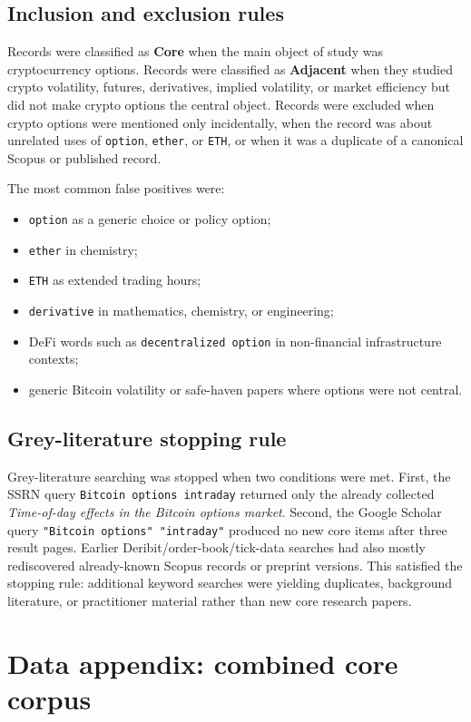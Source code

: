 \documentclass[11pt,a4paper]{article}
\begin{document}
\subsection{Inclusion and exclusion rules}

Records were classified as \textbf{Core} when the main object of study was cryptocurrency options. Records were classified as \textbf{Adjacent} when they studied crypto volatility, futures, derivatives, implied volatility, or market efficiency but did not make crypto options the central object. Records were excluded when crypto options were mentioned only incidentally, when the record was about unrelated uses of \texttt{option}, \texttt{ether}, or \texttt{ETH}, or when it was a duplicate of a canonical Scopus or published record.

The most common false positives were:
\begin{itemize}
    \item \texttt{option} as a generic choice or policy option;
    \item \texttt{ether} in chemistry;
    \item \texttt{ETH} as extended trading hours;
    \item \texttt{derivative} in mathematics, chemistry, or engineering;
    \item DeFi words such as \texttt{decentralized option} in non-financial infrastructure contexts;
    \item generic Bitcoin volatility or safe-haven papers where options were not central.
\end{itemize}

\subsection{Grey-literature stopping rule}

Grey-literature searching was stopped when two conditions were met. First, the SSRN query \texttt{Bitcoin options intraday} returned only the already collected \emph{Time-of-day effects in the Bitcoin options market}. Second, the Google Scholar query \texttt{"Bitcoin options" "intraday"} produced no new core items after three result pages. Earlier Deribit/order-book/tick-data searches had also mostly rediscovered already-known Scopus records or preprint versions. This satisfied the stopping rule: additional keyword searches were yielding duplicates, background literature, or practitioner material rather than new core research papers.

\section{Data appendix: combined core corpus}
\end{document}
